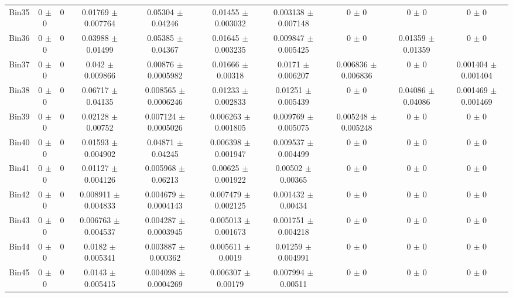 \begin{tabular}{@{\extracolsep{4pt}}lccccccccc@{}}
     Bin35 & 0 $\pm$ 0 & 0 & 0.01769 $\pm$ 0.007764 & 0.05304 $\pm$ 0.04246 & 0.01455 $\pm$ 0.003032 & 0.003138 $\pm$ 0.007148 & 0 $\pm$ 0 & 0 $\pm$ 0 & 0 $\pm$ 0 \\ 
     Bin36 & 0 $\pm$ 0 & 0 & 0.03988 $\pm$ 0.01499 & 0.05385 $\pm$ 0.04367 & 0.01645 $\pm$ 0.003235 & 0.009847 $\pm$ 0.005425 & 0 $\pm$ 0 & 0.01359 $\pm$ 0.01359 & 0 $\pm$ 0 \\ 
     Bin37 & 0 $\pm$ 0 & 0 & 0.042 $\pm$ 0.009866 & 0.00876 $\pm$ 0.0005982 & 0.01666 $\pm$ 0.00318 & 0.0171 $\pm$ 0.006207 & 0.006836 $\pm$ 0.006836 & 0 $\pm$ 0 & 0.001404 $\pm$ 0.001404 \\ 
     Bin38 & 0 $\pm$ 0 & 0 & 0.06717 $\pm$ 0.04135 & 0.008565 $\pm$ 0.0006246 & 0.01233 $\pm$ 0.002833 & 0.01251 $\pm$ 0.005439 & 0 $\pm$ 0 & 0.04086 $\pm$ 0.04086 & 0.001469 $\pm$ 0.001469 \\ 
     Bin39 & 0 $\pm$ 0 & 0 & 0.02128 $\pm$ 0.00752 & 0.007124 $\pm$ 0.0005026 & 0.006263 $\pm$ 0.001805 & 0.009769 $\pm$ 0.005075 & 0.005248 $\pm$ 0.005248 & 0 $\pm$ 0 & 0 $\pm$ 0 \\ 
     Bin40 & 0 $\pm$ 0 & 0 & 0.01593 $\pm$ 0.004902 & 0.04871 $\pm$ 0.04245 & 0.006398 $\pm$ 0.001947 & 0.009537 $\pm$ 0.004499 & 0 $\pm$ 0 & 0 $\pm$ 0 & 0 $\pm$ 0 \\ 
     Bin41 & 0 $\pm$ 0 & 0 & 0.01127 $\pm$ 0.004126 & 0.005968 $\pm$ 0.06213 & 0.00625 $\pm$ 0.001922 & 0.00502 $\pm$ 0.00365 & 0 $\pm$ 0 & 0 $\pm$ 0 & 0 $\pm$ 0 \\ 
     Bin42 & 0 $\pm$ 0 & 0 & 0.008911 $\pm$ 0.004833 & 0.004679 $\pm$ 0.0004143 & 0.007479 $\pm$ 0.002125 & 0.001432 $\pm$ 0.00434 & 0 $\pm$ 0 & 0 $\pm$ 0 & 0 $\pm$ 0 \\ 
     Bin43 & 0 $\pm$ 0 & 0 & 0.006763 $\pm$ 0.004537 & 0.004287 $\pm$ 0.0003945 & 0.005013 $\pm$ 0.001673 & 0.001751 $\pm$ 0.004218 & 0 $\pm$ 0 & 0 $\pm$ 0 & 0 $\pm$ 0 \\ 
     Bin44 & 0 $\pm$ 0 & 0 & 0.0182 $\pm$ 0.005341 & 0.003887 $\pm$ 0.000362 & 0.005611 $\pm$ 0.0019 & 0.01259 $\pm$ 0.004991 & 0 $\pm$ 0 & 0 $\pm$ 0 & 0 $\pm$ 0 \\ 
     Bin45 & 0 $\pm$ 0 & 0 & 0.0143 $\pm$ 0.005415 & 0.004098 $\pm$ 0.0004269 & 0.006307 $\pm$ 0.00179 & 0.007994 $\pm$ 0.00511 & 0 $\pm$ 0 & 0 $\pm$ 0 & 0 $\pm$ 0 \\ 
\hline\hline
  \end{tabular}
